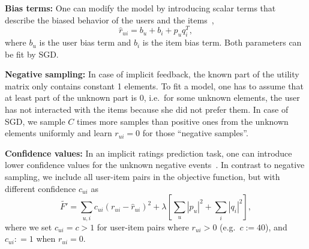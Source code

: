 \documentclass[10pt]{article}
\begin{document}
\textbf{Bias terms:}  
One can modify the model by introducing scalar terms that describe the biased behavior of the users and the items~\cite{koren2009matrix},
\begin{equation}
	\hat{r}_{ui} = b_u + b_i + p_u q_i^T,
\end{equation}
where $b_u$ is the user bias term and $b_i$ is the item bias term. Both parameters can be fit by SGD.

\textbf{Negative sampling:}  
In case of implicit feedback, the known part of the utility matrix only contains constant 1 elements.
To fit a model, one has to assume that at least part of the unknown part is 0, i.e.\ for some unknown elements, the user has not interacted with the items because she did not prefer them.
In case of SGD, we sample $C$ times more samples than positive ones from the unknown elements uniformly and learn $r_{ui} = 0$ for those ``negative samples''.

\textbf{Confidence values:}  
In an implicit ratings prediction task, one can introduce lower confidence values for the unknown negative events~\cite{hu2008collaborative}.
In contrast to negative sampling, we include all user-item pairs in the objective function, but  with different confidence $c_{ui}$ as
\begin{equation}
\tilde{F'} = \displaystyle\sum_{u,i} c_{ui} \left ( r_{ui} - \hat{r}_{ui} \right ) ^ 2 + \lambda \left [  \displaystyle\sum_u | p_u | ^ 2 + \displaystyle\sum_i |q_i| ^ 2\right],
\label{eq:obj-reg-all}
\end{equation}
where we set $c_{ui} = c > 1$ for user-item pairs where $r_{ui}>0$ (e.g.\ $c:=40$), and  $c_{ui}: = 1 $ when $r_{ui} = 0$.

\end{document}
